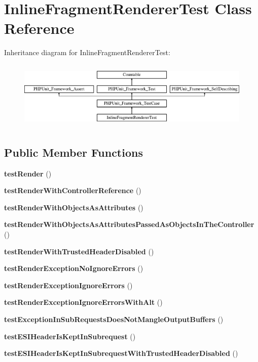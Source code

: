 \section{Inline\+Fragment\+Renderer\+Test Class Reference}
\label{class_symfony_1_1_component_1_1_http_kernel_1_1_tests_1_1_fragment_1_1_inline_fragment_renderer_test}
Inheritance diagram for Inline\+Fragment\+Renderer\+Test\+:\begin{figure}[H]
\begin{center}
\leavevmode
\includegraphics[height=3.303835cm]{class_symfony_1_1_component_1_1_http_kernel_1_1_tests_1_1_fragment_1_1_inline_fragment_renderer_test}
\end{center}
\end{figure}
\subsection*{Public Member Functions}
\begin{DoxyCompactItemize}
\item 
{\bf test\+Render} ()
\item 
{\bf test\+Render\+With\+Controller\+Reference} ()
\item 
{\bf test\+Render\+With\+Objects\+As\+Attributes} ()
\item 
{\bf test\+Render\+With\+Objects\+As\+Attributes\+Passed\+As\+Objects\+In\+The\+Controller} ()
\item 
{\bf test\+Render\+With\+Trusted\+Header\+Disabled} ()
\item 
{\bf test\+Render\+Exception\+No\+Ignore\+Errors} ()
\item 
{\bf test\+Render\+Exception\+Ignore\+Errors} ()
\item 
{\bf test\+Render\+Exception\+Ignore\+Errors\+With\+Alt} ()
\item 
{\bf test\+Exception\+In\+Sub\+Requests\+Does\+Not\+Mangle\+Output\+Buffers} ()
\item 
{\bf test\+E\+S\+I\+Header\+Is\+Kept\+In\+Subrequest} ()
\item 
{\bf test\+E\+S\+I\+Header\+Is\+Kept\+In\+Subrequest\+With\+Trusted\+Header\+Disabled} ()
\end{DoxyCompactItemize}
